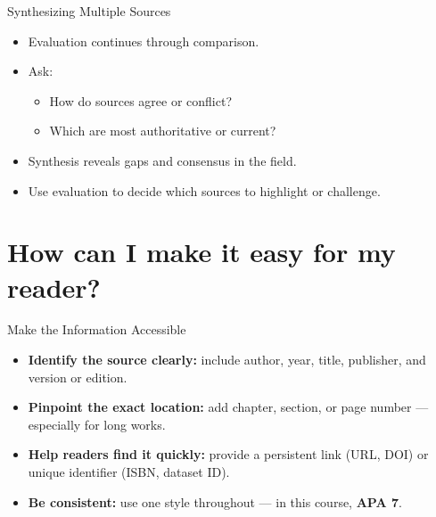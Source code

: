 \documentclass[aspectratio=169]{beamer}
\begin{document}
\begin{frame}{Synthesizing Multiple Sources}
\begin{itemize}
  \item Evaluation continues through comparison.
  \item Ask:
    \begin{itemize}
      \item How do sources agree or conflict?
      \item Which are most authoritative or current?
    \end{itemize}
  \item Synthesis reveals gaps and consensus in the field.
  \item Use evaluation to decide which sources to highlight or challenge.
\end{itemize}
\end{frame}



\section{How can I make it easy for my reader?}

\begin{frame}{Make the Information Accessible}

\begin{itemize}
  \item {} \textbf{Identify the source clearly:}
    include author, year, title, publisher, and version or edition.
  \item {} \textbf{Pinpoint the exact location:}
    add chapter, section, or page number — especially for long works.
  \item {} \textbf{Help readers find it quickly:}
    provide a persistent link (URL, DOI) or unique identifier (ISBN, dataset ID).
  \item {} \textbf{Be consistent:}
    use one style throughout --- in this course, \textbf{APA 7}.
\end{itemize}

\end{frame}
\end{document}
